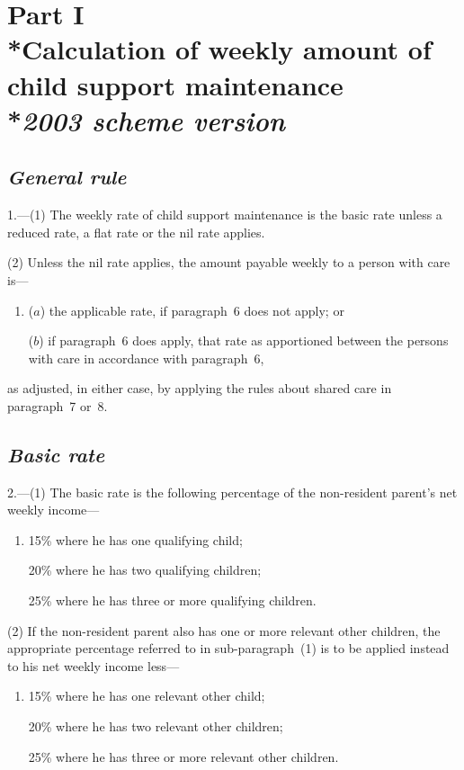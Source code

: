 \documentclass[12pt,a4paper]{article}
\begin{document}
\section[Part I --- Calculation of weekly amount of child support maintenance --- \emph{2003 scheme version}]{Part I\\*Calculation of weekly amount of child support maintenance\\*\emph{2003 scheme version}}

\subsection*{\itshape General rule}

1.---(1) The weekly rate of child support maintenance is the basic rate unless a reduced rate, a flat rate or the nil rate applies.

(2) Unless the nil rate applies, the amount payable weekly to a person with care is—
\begin{enumerate}\item[]
($a$) the applicable rate, if paragraph~6 does not apply; or

($b$) if paragraph~6 does apply, that rate as apportioned between the persons with care in accordance with paragraph~6,
\end{enumerate}
as adjusted, in either case, by applying the rules about shared care in paragraph~7 or~8. 

\subsection*{\itshape Basic rate}

2.---(1) The basic rate is the following percentage of the non-resident parent’s net weekly income—
\begin{enumerate}\item[]
    15\% where he has one qualifying child;

    20\% where he has two qualifying children;

    25\% where he has three or more qualifying children. 
\end{enumerate}

(2) If the non-resident parent also has one or more relevant other children, the appropriate percentage referred to in sub-paragraph~(1)  is to be applied instead to his net weekly income less—
\begin{enumerate}\item[]
    15\% where he has one relevant other child;

    20\% where he has two relevant other children;

    25\% where he has three or more relevant other children. 
\end{enumerate}
\end{document}
